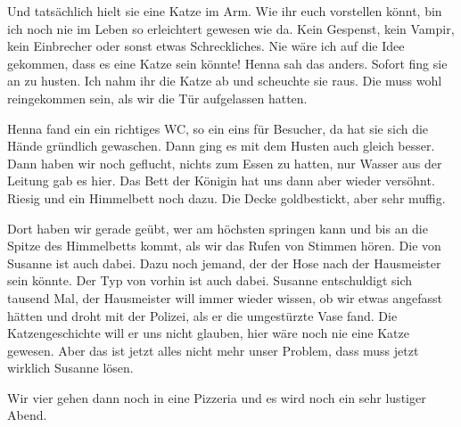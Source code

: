 Und tatsächlich hielt sie eine Katze im Arm. Wie ihr euch vorstellen könnt, bin ich noch nie im Leben so erleichtert gewesen wie da. Kein Gespenst, kein Vampir, kein Einbrecher oder sonst etwas Schreckliches. Nie wäre ich auf die Idee gekommen, dass es eine Katze sein könnte! Henna sah das anders. Sofort fing sie an zu husten. Ich nahm ihr die Katze ab und scheuchte sie raus. Die muss wohl reingekommen sein, als wir die Tür aufgelassen hatten.

Henna fand ein ein richtiges WC, so ein eins für Besucher, da hat sie sich die Hände gründlich gewaschen. Dann ging es mit dem Husten auch gleich besser. Dann haben wir noch geflucht, nichts zum Essen zu hatten, nur Wasser aus der Leitung gab es hier. Das Bett der Königin hat uns dann aber wieder versöhnt. Riesig und ein Himmelbett noch dazu. Die Decke goldbestickt, aber sehr muffig. 

Dort haben wir gerade geübt, wer am höchsten springen kann und bis an die Spitze des Himmelbetts kommt, als wir das Rufen von Stimmen hören. Die von Susanne ist auch dabei. Dazu noch jemand, der der Hose nach der Hausmeister sein könnte. Der Typ von vorhin ist auch dabei. Susanne entschuldigt sich tausend Mal, der Hausmeister will immer wieder wissen, ob wir etwas angefasst hätten und droht mit der Polizei, als er die umgestürzte Vase fand. Die Katzengeschichte will er uns nicht glauben, hier wäre noch nie eine Katze gewesen. Aber das ist jetzt alles nicht mehr unser Problem, dass muss jetzt wirklich Susanne lösen.

Wir vier gehen dann noch in eine Pizzeria und es wird noch ein sehr lustiger Abend. \hfill {\color{red}\decofourleft}




